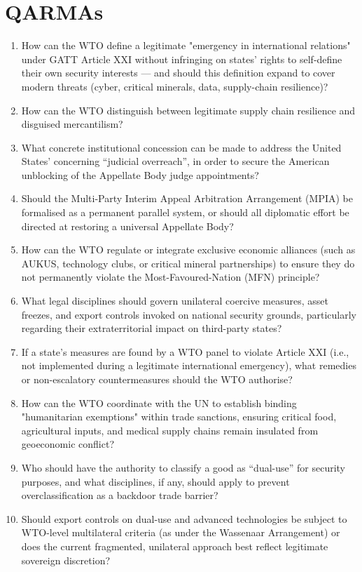 \section{QARMAs}

\begin{enumerate}
  \item How can the WTO define a legitimate "emergency in international relations" under GATT Article XXI without infringing on states' rights to self-define their own security interests — and should this definition expand to cover modern threats (cyber, critical minerals, data, supply-chain resilience)?
  \item How can the WTO distinguish between legitimate supply chain resilience and disguised mercantilism?
  \item What concrete institutional concession can be made to address the United States’ concerning “judicial overreach”, in order to secure the American unblocking of the Appellate Body judge appointments?
  \item Should the Multi-Party Interim Appeal Arbitration Arrangement (MPIA) be formalised as a permanent parallel system, or should all diplomatic effort be directed at restoring a universal Appellate Body?
  \item How can the WTO regulate or integrate exclusive economic alliances (such as AUKUS, technology clubs, or critical mineral partnerships) to ensure they do not permanently violate the Most-Favoured-Nation (MFN) principle?
  \item What legal disciplines should govern unilateral coercive measures, asset freezes, and export controls invoked on national security grounds, particularly regarding their extraterritorial impact on third-party states?
  \item If a state's measures are found by a WTO panel to violate Article XXI (i.e., not implemented during a legitimate international emergency), what remedies or non-escalatory countermeasures should the WTO authorise?
  \item How can the WTO coordinate with the UN to establish binding "humanitarian exemptions" within trade sanctions, ensuring critical food, agricultural inputs, and medical supply chains remain insulated from geoeconomic conflict?
  \item Who should have the authority to classify a good as “dual-use” for security purposes, and what disciplines, if any, should apply to prevent overclassification as a backdoor trade barrier?
  \item Should export controls on dual-use and advanced technologies be subject to WTO-level multilateral criteria (as under the Wassenaar Arrangement) or does the current fragmented, unilateral approach best reflect legitimate sovereign discretion?

\end{enumerate}
